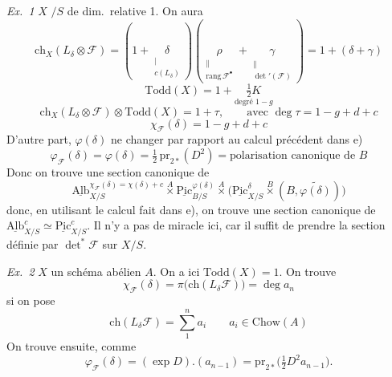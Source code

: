 \documentclass[11pt,a4paper]{article}
\begin{document}
\emph{Ex.\ 1} $X$ $/S$ de dim.\ relative 1. On aura
\[
\mathrm{ch}_X(L_{\delta} \otimes \mathcal{F}) =
(1 + \underset{\substack{\mid \\ c(L_{\delta})}}{\delta})
(\underset{\substack{\parallel \\ \mathrm{rang}\,\mathcal{F}^{\bullet}}}{\rho} + \underset{\substack{\parallel \\ \det'(\mathcal{F})}}{\gamma})
= 1 + (\delta + \gamma)
\]
\[
\mathrm{Todd}(X) = 1 + \underset{\text{degré } 1-g}{\tfrac{1}{2}K}
\]
\[
\mathrm{ch}_X(L_{\delta} \otimes \mathcal{F}) \otimes \mathrm{Todd}(X) = 1 + \tau ,
\qquad \text{avec } \deg \tau = 1 - g + d + c
\]
\[
\boxed{\chi_{\mathcal{F}}(\delta) = 1 - g + d + c}
\]
D'autre part, $\varphi(\delta)$ ne  changer 
\struck{\ill{}} par rapport au calcul précédent dans e)
\[
\boxed{\varphi_{\mathcal{F}}(\delta) = \varphi(\delta) = \tfrac{1}{2}\, \mathrm{pr}_{2*}(D^{2})
= \text{polarisation canonique de } B}
\]
Donc on trouve une section canonique de
\[
\underline{\mathrm{Alb}}^{\chi_{\mathcal{F}}(\delta) = \chi(\delta) + c}_{X/S}
\overset{A}{\times} \underline{\mathrm{Pic}}^{\varphi(\delta)}_{B/S}
\overset{A}{\times} \bigl(\underline{\mathrm{Pic}}^{\delta}_{X/S} \overset{B}{\times} (B, \widetilde{\varphi(\delta)})\bigr)
\]
donc, en utilisant le calcul fait dans e), on trouve une section canonique de
$\underline{\mathrm{Alb}}^{c}_{X/S} \simeq \underline{\mathrm{Pic}}^{c}_{X/S}$.
Il n'y a pas de miracle ici, car il suffit de prendre la section définie par
 $\det^{*}\mathcal{F}$ sur $X/S$.


\emph{Ex.\ 2} $X$ un schéma abélien $A$. On a ici $\mathrm{Todd}(X) = 1$.
On trouve
\[
\chi_{\mathcal{F}}(\delta) = \pi\bigl(\mathrm{ch}(L_{\delta}\mathcal{F})\bigr) = \deg a_n
\]
si on pose
\[
\mathrm{ch}(L_{\delta}\mathcal{F}) = \sum_{1}^{n} a_i \qquad a_i \in \mathrm{Chow}(A)
\]
On trouve ensuite, comme  
\[
\varphi_{\mathcal{F}}(\delta) = (\exp D) . (a_{n-1}) = \mathrm{pr}_{2*}\bigl(\tfrac{1}{2} D^{2} a_{n-1}\bigr) .
\]
\end{document}
